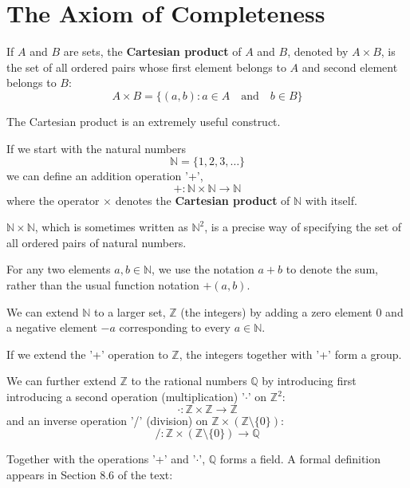 \section{The Axiom of Completeness}

\begin{definition} If $A$ and $B$ are sets, the \textbf{Cartesian product} of $A$ and $B$, denoted by $A\times B$, is the set of all ordered pairs whose first element belongs to $A$ and second element belongs to $B$:
\[
A\times B = \{(a,b) : a\in A\quad\mbox{and}\quad b\in B\} 
\]
\end{definition}

The Cartesian product is an extremely useful construct.


If we start with the natural numbers
\[
\mathbb{N}=\{1,2,3,\ldots\} 
\]
we can define an addition operation '+',  
\[
+ : \mathbb{N}\times\mathbb{N} \rightarrow \mathbb{N}
\]
where the operator $\times$ denotes the \textbf{Cartesian product} of $\mathbb{N}$ with itself.
\par\vspace{0.3 cm}
$\mathbb{N}\times\mathbb{N}$, which is sometimes written as $\mathbb{N}^2$, is a precise way of specifying the set of all ordered pairs 
of natural numbers.
\par\vspace{0.3 cm}
For any two elements $a,b\in\mathbb{N}$, we use the notation $a+b$ to denote the sum, rather than the usual function notation $+(a,b)$.
\par\vspace{0.3 cm}
We can extend $\mathbb{N}$ to a larger set, $\mathbb{Z}$ (the integers) by adding a zero element $0$ and a negative element $-a$ corresponding to every $a\in\mathbb{N}$.
\par\vspace{0.3 cm}
If we extend the '+' operation to $\mathbb{Z}$, the integers together with '+' form a group.
\par\vspace{0.3 cm}
We can further extend $\mathbb{Z}$ to the rational numbers $\mathbb{Q}$ by introducing first introducing a second operation (multiplication) '$\cdot$' on $\mathbb{Z}^2$:
\[
\cdot : \mathbb{Z}\times\mathbb{Z}\rightarrow\mathbb{Z}
\]
and an inverse operation '/' (division) on $\mathbb{Z}\times(\mathbb{Z}\setminus\{0\})$:
\[
/ : \mathbb{Z}\times(\mathbb{Z}\setminus\{0\})\rightarrow\mathbb{Q}
\] 
\par\vspace{0.3 cm}
Together with the operations '+' and '$\cdot$', $\mathbb{Q}$ forms a field.  A formal definition appears in Section 8.6 of the text:
